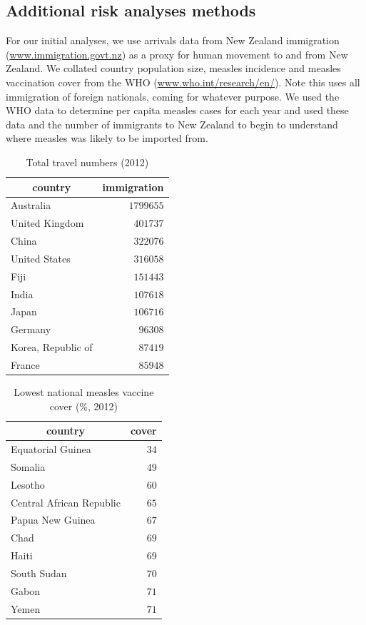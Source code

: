 \documentclass{article}
\begin{document}
\subsection{Additional risk analyses methods}

For our initial analyses, we use arrivals data from New Zealand immigration (\href{http://www.immigration.govt.nz/}{www.immigration.govt.nz}) as a proxy for human movement to and from New Zealand. We collated country population size, measles incidence and measles vaccination cover from the WHO (\href{http://www.who.int/research/en/}{www.who.int/research/en/}). Note this uses all immigration of foreign nationals, coming for whatever purpose. We used the WHO data to determine per capita measles cases for each year and used these data and the number of immigrants to New Zealand to begin to understand where measles was likely to be imported from.


\begin{table}
\caption{Total travel numbers (2012)}
\begin{center}
\begin{tabular}{lr}
\hline\hline
\multicolumn{1}{c}{country}&\multicolumn{1}{c}{immigration}\tabularnewline
\hline
Australia&$1799655$\tabularnewline
United Kingdom&$ 401737$\tabularnewline
China&$ 322076$\tabularnewline
United States&$ 316058$\tabularnewline
Fiji&$ 151443$\tabularnewline
India&$ 107618$\tabularnewline
Japan&$ 106716$\tabularnewline
Germany&$  96308$\tabularnewline
Korea, Republic of&$  87419$\tabularnewline
France&$  85948$\tabularnewline
\hline
\end{tabular}\end{center}\label{table:immigration12}
\end{table}


\begin{table}
\caption{Lowest national measles vaccine cover (\%, 2012)}
\begin{center}
\begin{tabular}{lr}
\hline\hline
\multicolumn{1}{c}{country}&\multicolumn{1}{c}{cover}\tabularnewline
\hline
Equatorial Guinea&$34$\tabularnewline
Somalia&$49$\tabularnewline
Lesotho&$60$\tabularnewline
Central African Republic&$65$\tabularnewline
Papua New Guinea&$67$\tabularnewline
Chad&$69$\tabularnewline
Haiti&$69$\tabularnewline
South Sudan&$70$\tabularnewline
Gabon&$71$\tabularnewline
Yemen&$71$\tabularnewline
\hline
\end{tabular}\end{center}\label{table:cover12}
\end{table}
\end{document}

